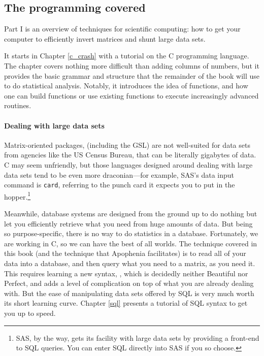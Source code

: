 \begin{multicols}{2}
\section{The programming covered}

Part I is an overview of techniques for scientific computing: how to get
your computer to efficiently invert matrices and shunt large data sets.

It starts in Chapter \ref{c_crash} with a tutorial on the C programming
language.  The chapter covers nothing more difficult than adding
columns of numbers, but it provides the basic grammar and structure that
the remainder of the book will use to do statistical analysis. Notably,
it introduces the idea of functions, and how one can build functions or
use existing functions to execute increasingly advanced routines.

\paragraph{Dealing with large data sets} Matrix-oriented packages,
(including the GSL) are not well-suited for data sets from agencies like
the US Census Bureau, that can be literally gigabytes of data.
C may seem unfriendly, but
those languages designed around dealing with large data sets tend
to be even more draconian---for example, SAS's data input command
is {\tt card}, referring to the punch card it expects you to put in the
hopper.\footnote{SAS, by the way, gets its facility with large data sets
by providing a front-end to SQL queries. You can enter SQL directly into
SAS if you so choose.}

Meanwhile, database systems are designed from the ground up to do nothing
but let you efficiently retrieve what you need from huge amounts of data.
But being so purpose-specific, there is no way to do statistics in
a database. Fortunately,
we are working in C, so we can have the best of all worlds. The technique
covered in this book (and the technique that Apophenia facilitates)
is to
read all of your data into a database, and then query what you need to a
matrix, as you need it. This requires learning a new syntax, ,
which is decidedly neither Beautiful nor Perfect, and adds a level of
complication on top of what you are already dealing with. But the ease
of manipulating data sets offered by SQL is very much worth its short
learning curve. Chapter \ref{sql} presents a tutorial of SQL syntax to
get you up to speed. 


\end{multicols}

